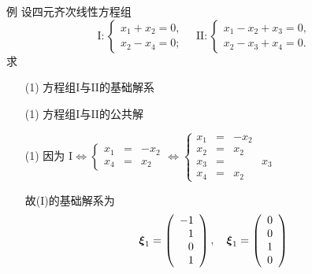 \begin{frame}
  \begin{footnotesize}
    \begin{exampleblock}{例}
      设四元齐次线性方程组
      $$
      \mbox{I}:\left\{
      \begin{array}{l}
        x_1+x_2=0,\\
        x_2-x_4=0;
      \end{array}
      \right. \quad
      \mbox{II}:\left\{
      \begin{array}{l}
        x_1-x_2+x_3=0,\\
        x_2-x_3+x_4=0.
      \end{array}
      \right.
      $$
      求
      \begin{itemize}
      \item[(1)] 方程组I与II的基础解系
      \item[(1)] 方程组I与II的公共解        
      \end{itemize}
    \end{exampleblock}
    \pause\jiename
    \begin{itemize}
    \item[(1)]因为
      $
      \mbox{I} \Longleftrightarrow
      \left\{
      \begin{array}{rcr}
        x_1&=&-x_2\\[0.05in]
        x_4&=&x_2
      \end{array}
      \right. \Longleftrightarrow
      \left\{
      \begin{array}{rcrr}
        x_1&=&-x_2&\\[0.05in]
        x_2&=&x_2&\\[0.05in]
        x_3&=&&x_3\\[0.05in]
        x_4&=&x_2&
      \end{array}
      \right. 
      $\pause 
      
      故(I)的基础解系为
      $$
      \boldsymbol{\xi}_1=\left(
      \begin{array}{r}
        -1\\1\\0\\1
      \end{array}
      \right), \quad
      \boldsymbol{\xi}_1=\left(
      \begin{array}{r}
        0\\0\\1\\0
      \end{array}
      \right)
      $$
    \end{itemize}
  \end{footnotesize}
\end{frame}

